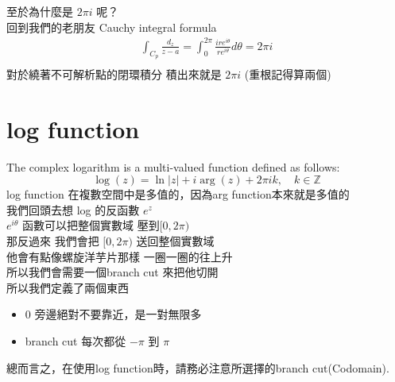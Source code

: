 \documentclass{article}
\begin{document}
至於為什麼是 $2\pi i$ 呢？\\
回到我們的老朋友 Cauchy integral formula\\
\begin{align*}
    \int_{C_{p}} \frac{d_z}{z-a} = \int_{0}^{2\pi} \frac{ire^{i\theta}}{re^{i\theta}}  d\theta = 2\pi i \\
\end{align*}
對於繞著不可解析點的閉環積分 積出來就是 $2\pi i$ (重根記得算兩個)\\

\section{log function}
The complex logarithm is a multi-valued function defined as follows:
\[
\log(z) = \ln|z| + i\arg(z) + 2\pi i k, \quad k \in \mathbb{Z}
\]
log function 在複數空間中是多值的，因為arg function本來就是多值的\\
我們回頭去想 log 的反函數 $e^{z}$\\
$e^{i\theta}$ 函數可以把整個實數域 壓到$[0, 2\pi)$\\
那反過來 我們會把 $[0, 2\pi)$ 送回整個實數域\\
他會有點像螺旋洋芋片那樣 一圈一圈的往上升\\
所以我們會需要一個branch cut 來把他切開\\

所以我們定義了兩個東西 \\
\begin{itemize}
    \item 0 旁邊絕對不要靠近，是一對無限多
    \item branch cut 每次都從 $-\pi$ 到 $\pi$
\end{itemize}
總而言之，在使用log function時，請務必注意所選擇的branch cut(Codomain).\\
\end{document}
